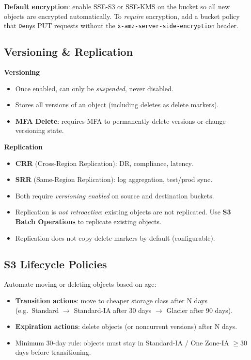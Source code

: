 \begin{examtip}
\textbf{Default encryption}: enable SSE-S3 or SSE-KMS on the bucket so all new objects
are encrypted automatically. To \emph{require} encryption, add a bucket policy that
\texttt{Deny}s PUT requests without the \texttt{x-amz-server-side-encryption} header.
\end{examtip}

\subsection{Versioning \& Replication}

\textbf{Versioning}
\begin{itemize}
  \item Once enabled, can only be \emph{suspended}, never disabled.
  \item Stores all versions of an object (including deletes as delete markers).
  \item \textbf{MFA Delete}: requires MFA to permanently delete versions or change versioning state.
\end{itemize}

\textbf{Replication}
\begin{itemize}
  \item \textbf{CRR} (Cross-Region Replication): DR, compliance, latency.
  \item \textbf{SRR} (Same-Region Replication): log aggregation, test/prod sync.
  \item Both require \emph{versioning enabled} on source and destination buckets.
  \item Replication is \emph{not retroactive}: existing objects are not replicated.
        Use \textbf{S3 Batch Operations} to replicate existing objects.
  \item Replication does not copy delete markers by default (configurable).
\end{itemize}

\subsection{S3 Lifecycle Policies}

Automate moving or deleting objects based on age:
\begin{itemize}
  \item \textbf{Transition actions}: move to cheaper storage class after N days
        (e.g.\ Standard $\rightarrow$ Standard-IA after 30 days $\rightarrow$ Glacier after 90 days).
  \item \textbf{Expiration actions}: delete objects (or noncurrent versions) after N days.
  \item Minimum 30-day rule: objects must stay in Standard-IA / One Zone-IA $\geq$30 days before transitioning.
\end{itemize}

